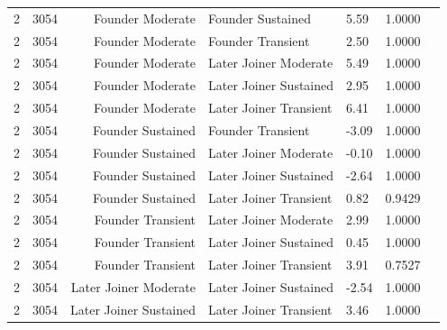 \begin{table}[H]
\begin{tabular}{l r r l l r r}
2 & 3054 & Founder Moderate & Founder Sustained & 5.59 & 1.0000 \\ 
2 & 3054 & Founder Moderate & Founder Transient & 2.50 & 1.0000 \\ 
2 & 3054 & Founder Moderate & Later Joiner Moderate & 5.49 & 1.0000 \\ 
2 & 3054 & Founder Moderate & Later Joiner Sustained & 2.95 & 1.0000 \\ 
2 & 3054 & Founder Moderate & Later Joiner Transient & 6.41 & 1.0000 \\ 
2 & 3054 & Founder Sustained & Founder Transient & -3.09 & 1.0000 \\ 
2 & 3054 & Founder Sustained & Later Joiner Moderate & -0.10 & 1.0000 \\ 
2 & 3054 & Founder Sustained & Later Joiner Sustained & -2.64 & 1.0000 \\ 
2 & 3054 & Founder Sustained & Later Joiner Transient & 0.82 & 0.9429 \\ 
2 & 3054 & Founder Transient & Later Joiner Moderate & 2.99 & 1.0000 \\ 
2 & 3054 & Founder Transient & Later Joiner Sustained & 0.45 & 1.0000 \\ 
2 & 3054 & Founder Transient & Later Joiner Transient & 3.91 & 0.7527 \\ 
2 & 3054 & Later Joiner Moderate & Later Joiner Sustained & -2.54 & 1.0000 \\ 
2 & 3054 & Later Joiner Sustained & Later Joiner Transient & 3.46 & 1.0000 \\ 
\bottomrule
\end{tabular}%
\label{tab:codebase_graph_latex_repository_graph_component_time_series_holm_bonferroni_no_sig_one_and_twoclasses} 
\end{table}
\newpage 
